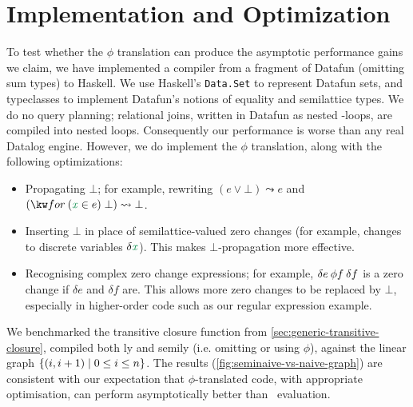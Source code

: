 \section{Implementation and Optimization}
\label{sec:implementation}

\newcommand\rewrites\leadsto

To test whether the $\phi$ translation can produce the asymptotic performance
gains we claim, we have implemented a compiler from a fragment of Datafun
(omitting sum types) to Haskell.
%
We use Haskell's \texttt{Data.Set} to represent Datafun sets, and
typeclasses to implement Datafun's notions of equality and semilattice types.
%
We do no query planning; relational joins, written in Datafun as nested
-loops, are compiled into nested loops.
%
Consequently our performance is worse than any real Datalog engine.
%
However, we do implement the $\phi$ translation, along with the following
optimizations:

\begin{itemize}
\item Propagating $\bot$; for example, rewriting $(e \vee \bot) \rewrites e$ and
  $(\efor{x}{e} \bot) \rewrites \bot$.

\item Inserting $\bot$ in place of semilattice-valued zero changes (for example,
  changes to discrete variables $\delta \dvar x$). This makes $\bot$-propagation
  more effective.

\item Recognising complex zero change expressions; for example, $\delta e \<\phi
  f \<\delta f$ is a zero change if $\delta e$ and $\delta f$ are. This allows
  more zero changes to be replaced by $\bot$, especially in higher-order code
  such as our regular expression example.
\end{itemize}



We benchmarked the transitive closure function  from
\cref{sec:generic-transitive-closure}, compiled both \naive{}ly and
semi\naive{}ly (i.e. omitting or using $\phi$), against the linear graph
$\{(i,i+1) \mathrel{|} 0 \le i \le n\}$. The results
(\cref{fig:seminaive-vs-naive-graph}) are consistent with our expectation that
$\phi$-translated code, with appropriate optimisation, can perform
asymptotically better than \naive\ evaluation.

